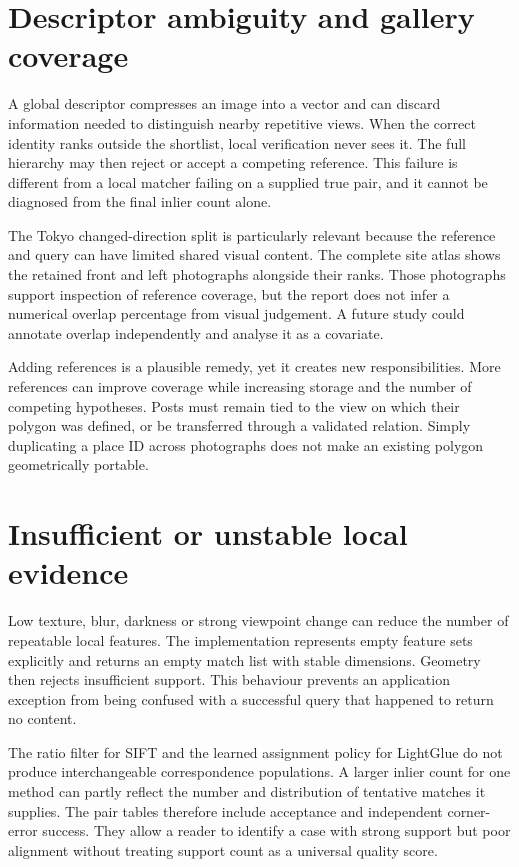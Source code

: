 \section{Descriptor ambiguity and gallery coverage}
A global descriptor compresses an image into a vector and can discard information needed to distinguish nearby repetitive views. When the correct identity ranks outside the shortlist, local verification never sees it. The full hierarchy may then reject or accept a competing reference. This failure is different from a local matcher failing on a supplied true pair, and it cannot be diagnosed from the final inlier count alone.

The Tokyo changed-direction split is particularly relevant because the reference and query can have limited shared visual content. The complete site atlas shows the retained front and left photographs alongside their ranks. Those photographs support inspection of reference coverage, but the report does not infer a numerical overlap percentage from visual judgement. A future study could annotate overlap independently and analyse it as a covariate.

Adding references is a plausible remedy, yet it creates new responsibilities. More references can improve coverage while increasing storage and the number of competing hypotheses. Posts must remain tied to the view on which their polygon was defined, or be transferred through a validated relation. Simply duplicating a place ID across photographs does not make an existing polygon geometrically portable.

\section{Insufficient or unstable local evidence}
Low texture, blur, darkness or strong viewpoint change can reduce the number of repeatable local features. The implementation represents empty feature sets explicitly and returns an empty match list with stable dimensions. Geometry then rejects insufficient support. This behaviour prevents an application exception from being confused with a successful query that happened to return no content.

The ratio filter for SIFT and the learned assignment policy for LightGlue do not produce interchangeable correspondence populations. A larger inlier count for one method can partly reflect the number and distribution of tentative matches it supplies. The pair tables therefore include acceptance and independent corner-error success. They allow a reader to identify a case with strong support but poor alignment without treating support count as a universal quality score.

